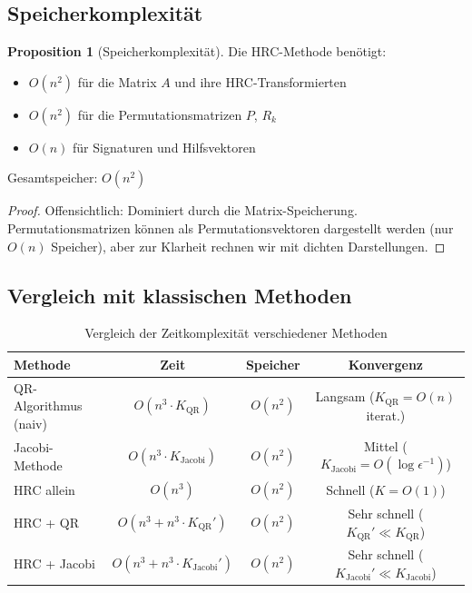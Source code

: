 \documentclass[a4paper,12pt]{article}
\theoremstyle{definition}
\newtheorem{proposition}{Proposition}
\begin{document}
\subsection{Speicherkomplexität}

\begin{proposition}[Speicherkomplexität]
Die HRC-Methode benötigt:
\begin{itemize}
	\item $O(n^2)$ für die Matrix $A$ und ihre HRC-Transformierten
	\item $O(n^2)$ für die Permutationsmatrizen $P$, $R_k$
	\item $O(n)$ für Signaturen und Hilfsvektoren
\end{itemize}

Gesamtspeicher: $O(n^2)$
\end{proposition}

\begin{proof}
Offensichtlich: Dominiert durch die Matrix-Speicherung. Permutationsmatrizen können als Permutationsvektoren dargestellt werden (nur $O(n)$ Speicher), aber zur Klarheit rechnen wir mit dichten Darstellungen.
\end{proof}

\subsection{Vergleich mit klassischen Methoden}

\begin{table}
\centering
\caption{Vergleich der Zeitkomplexität verschiedener Methoden}
\label{tab:complexity_comparison}
\begin{tabular}{|l|c|c|c|}
\hline
\textbf{Methode} & \textbf{Zeit} & \textbf{Speicher} & \textbf{Konvergenz} \\
\hline
QR-Algorithmus (naiv) & $O(n^3 \cdot K_{\text{QR}})$ & $O(n^2)$ & Langsam ($K_{\text{QR}} = O(n)$ iterat.) \\
\hline
Jacobi-Methode & $O(n^3 \cdot K_{\text{Jacobi}})$ & $O(n^2)$ & Mittel ($K_{\text{Jacobi}} = O(\log \epsilon^{-1})$) \\
\hline
HRC allein & $O(n^3)$ & $O(n^2)$ & Schnell ($K = O(1)$) \\
\hline
HRC + QR & $O(n^3 + n^3 \cdot K_{\text{QR}}')$ & $O(n^2)$ & Sehr schnell ($K_{\text{QR}}' \ll K_{\text{QR}}$) \\
\hline
HRC + Jacobi & $O(n^3 + n^3 \cdot K_{\text{Jacobi}}')$ & $O(n^2)$ & Sehr schnell ($K_{\text{Jacobi}}' \ll K_{\text{Jacobi}}$) \\
\hline
\end{tabular}
\end{table}
\end{document}
